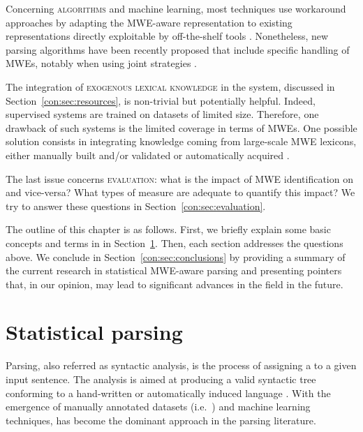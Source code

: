 \documentclass[output=paper]{langsci/langscibook}
\begin{document}
Concerning \textsc{algorithms} and machine learning, most techniques use worka\-round approaches by adapting the MWE-aware representation to existing representations directly exploitable by off-the-shelf tools \citep{nasretal15}. Nonetheless, new parsing algorithms have been recently proposed that include specific handling of MWEs, notably when using joint strategies \citep{nivre:2014}. 

The integration of \textsc{exogenous lexical knowledge} in the system, discussed in  Section~\ref{con:sec:resources}, is non-trivial but potentially helpful. Indeed, supervised systems are trained on datasets of limited size. Therefore, one drawback of such systems is the limited coverage in terms of MWEs. One possible solution consists in integrating knowledge coming from large-scale MWE lexicons, either manually built and\slash or validated \citep{candito2014strategies} or automatically acquired \citep{schneider:2012}.

The last issue concerns \textsc{evaluation}: what is the impact of MWE identification on  and vice-versa? What types of measure are adequate to quantify this impact? We try to answer these questions in Section~\ref{con:sec:evaluation}.


The outline of this chapter is as follows. First, we briefly explain some basic concepts and terms in  in Section~\ref{con:sec:parsing}. Then, each section addresses the questions above. We conclude in Section~\ref{con:sec:conclusions} by providing a summary of the current research in statistical MWE-aware parsing and presenting pointers that, in our opinion, may lead to significant advances in the field in the future.



%
\section{Statistical parsing}
\label{con:sec:parsing}

Parsing, also referred as syntactic analysis, is the process of assigning a  to a given input sentence.
The analysis is aimed at producing a valid syntactic tree conforming to a hand-written or automatically induced language .
With the emergence of manually annotated datasets (i.e.\ ) and machine learning techniques,
 \citep{collins1996new,charniak2000maximum} has become the dominant approach in the parsing literature. 
\end{document}
